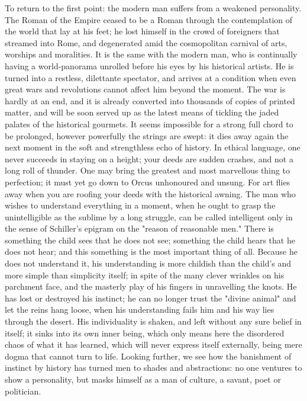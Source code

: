 To return to the first point: the modern man suffers from a weakened
personality. The Roman of the Empire ceased to be a Roman through the
contemplation of the world that lay at his feet; he lost himself in
the crowd of foreigners that streamed into Rome, and degenerated amid
the cosmopolitan carnival of arts, worships and moralities. It is the
same with the modern man, who is continually having a world-panorama
unrolled before his eyes by his historical artists. He is turned into
a restless, dilettante spectator, and arrives at a condition when
even great wars and revolutions cannot affect him beyond the moment.
The war is hardly at an end, and it is already converted into
thousands of copies of printed matter, and will be soon served up as
the latest means of tickling the jaded palates of the historical
gourmets. It seems impossible for a strong full chord to be
prolonged, however powerfully the strings are swept: it dies away
again the next moment in the soft and strengthless echo of history.
In ethical language, one never succeeds in staying on a height; your
deeds are sudden crashes, and not a long roll of thunder. One may
bring the greatest and most marvellous thing to perfection; it must
yet go down to Orcus unhonoured and unsung. For art flies away when
you are roofing your deeds with the historical awning. The man who
wishes to understand everything in a moment, when he ought to grasp
the unintelligible as the sublime by a long struggle, can be called
intelligent only in the sense of Schiller's epigram on the "reason of
reasonable men." There is something the child sees that he does not
see; something the child hears that he does not hear; and this
something is the most important thing of all. Because he does not
understand it, his understanding is more childish than the child's
and more simple than simplicity itself; in spite of the many clever
wrinkles on his parchment face, and the masterly play of his fingers
in unravelling the knots. He has lost or destroyed his instinct; he
can no longer trust the "divine animal" and let the reins hang loose,
when his understanding fails him and his way lies through the desert.
His individuality is shaken, and left without any sure belief in
itself; it sinks into its own inner being, which only means here the
disordered chaos of what it has learned, which will never express
itself externally, being mere dogma that cannot turn to life. Looking
further, we see how the banishment of instinct by history has turned
men to shades and abstractions: no one ventures to show a
personality, but masks himself as a man of culture, a savant, poet or
politician.

